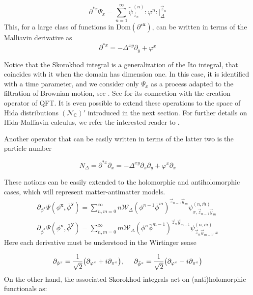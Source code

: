 \documentclass{elsarticle}%
\begin{document}
\begin{equation}
\label{eq:actionSkorokhod}
\partial^{*{x}}\Psi_{{x}}=\sum_{n=1}^{\infty} \tilde{\psi}^{(n)}_{\vec{z}_n}:\varphi^n:\lvert_\Delta^{\vec{z}_n}
\end{equation}
This, for a large class of functions in $\textrm{Dom}(\partial^{\star\mathbf{x}})$, can be written in terms of the Malliavin derivative as 
\begin{equation}
\label{eq:creationOperator}
\partial^{*{x}}=-\Delta^{xy}\partial_y+\varphi^x
\end{equation} 

Notice that the Skorokhod integral is a generalization of the Ito integral, that coincides with it when the domain has dimension one. In this case, it  is identified with a time parameter, and we consider only $\Psi_x$ as a process adapted to the filtration of Brownian motion, see \cite{nunnoMalliavinCalculus2009}. See \cite{alonsoGeometricFlavours2024} for its connection with the creation operator of QFT.
It is even possible to extend these operations to the space of Hida distributions  $(\mathcal{N}_\mathbb{C})'$ introduced in the next section. For further details on Hida-Malliavin calculus,  we refer the interested reader to  \cite{nunnoMalliavinCalculus2009}.

Another operator that can be easily written in terms of the latter two is the particle number 

\begin{equation}
\label{eq:particleNumber}
N_{\Delta}=\partial^{*x}\partial_x=-\Delta^{xy}\partial_x\partial_y+\varphi^x\partial_x
\end{equation}

These notions can be easily extended to the holomorphic and antiholomorphic cases, which will represent matter-antimatter  models. 
\begin{gather}
\label{eq:holomorphicMalliavin}
\partial_{\phi^x}\Psi(\phi^{\mathbf{x}},\bar\phi^\mathbf{y})=\sum_{n,m=0}^\infty n\mathcal{W}_\Delta(\phi^{n-1}\bar{\phi}^m)^{\vec{z}_{n-1}\vec{y}_m}\psi^{(n,\bar{m})}_{x,\vec{z}_{n-1}\vec{y}_m} \\
\partial_{\bar\phi^x}\Psi(\phi^{\mathbf{x}},\bar\phi^\mathbf{y})=\sum_{n,m=0}^\infty m\mathcal{W}_\Delta(\phi^{n}\bar{\phi}^{m-1})^{\vec{z}_{n}\vec{y}_{m-1}}\psi^{(n,\bar{m})}_{\vec{z}_{n}\vec{y}_{m-1},x} 
\end{gather}
Here each derivative must be understood in the Wirtinger sense 

\begin{equation}
\label{eq:wirtinger}
\partial_{\phi^x}=\frac{1}{\sqrt{2}}\big(\partial_{\varphi^x}+i \partial_{\pi^x} \big),\hspace{0.5 cm} \partial_{\bar\phi^x}=\frac{1}{\sqrt{2}}\big(\partial_{\varphi^x}-i \partial_{\pi^x} \big)
\end{equation}
On the other hand, the associated Skorokhod integrals act on (anti)holomorphic functionals as: 
\end{document}
